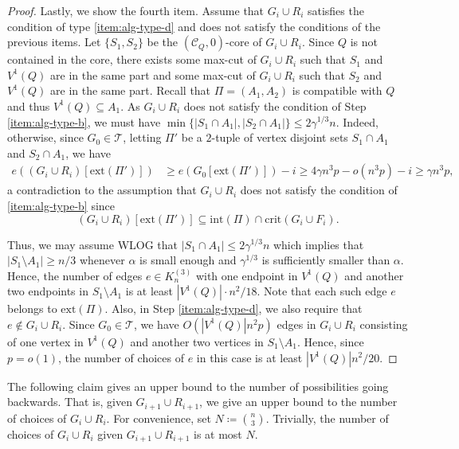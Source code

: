 \documentclass[11pt,a4paper,oneside,reqno]{amsart}
\newcommand{\cC}{\mathcal{C}}
\newcommand{\cT}{\mathcal{T}}
\newcommand{\1}{\mathbbm{1}} %
\renewcommand{\le}{\leqslant}
\renewcommand{\ge}{\geqslant}
\newcommand{\ext}{\mathrm{ext}}
\renewcommand{\int}{\mathrm{int}}
\newcommand{\crit}{\mathrm{crit}}
\begin{document}
\begin{proof}
    Lastly, we show the fourth item. Assume that $G_i \cup R_i$ satisfies the condition of type \ref{item:alg-type-d} and does not satisfy the conditions of the previous items. 
    Let $\{S_1, S_2\}$ be the $(\cC_Q, 0)$-core of $G_i \cup R_i$. Since $Q$ is not contained in the core,  there exists some max-cut of $G_i \cup R_i$ such that $S_1$ and $V^1(Q)$ are in the same part and some max-cut of $G_i \cup R_i$ such that $S_2$ and $V^1(Q)$ are in the same part. Recall that $\Pi = (A_1, A_2)$ is compatible with $Q$ and thus $V^1(Q) \subseteq A_1$. As $G_i \cup R_i$ does not satisfy the condition of Step \ref{item:alg-type-b}, we must have $\min\{|S_1 \cap A_1|, |S_2 \cap A_1|\} \le 2 \gamma^{1/3} n$. Indeed, otherwise, since $G_0 \in \cT$, letting $\Pi'$ be a $2$-tuple of vertex disjoint sets $S_1 \cap A_1$ and $S_2 \cap A_1$, we have
    \begin{align*}
        e\left((G_{i}\cup R_i)[\ext(\Pi')]\right) &\ge e\left(G_0[\ext(\Pi')]\right) - i \ge 4\gamma n^3 p - o(n^3 p) - i \ge \gamma n^3 p,
    \end{align*}
    a contradiction to the assumption that $G_i \cup R_i$ does not satisfy the condition of \ref{item:alg-type-b} since 
    \[
        (G_{i}\cup R_i)[\ext(\Pi')] \subseteq \int(\Pi) \cap \crit(G_i \cup F_i).
    \]
    
    Thus, we may assume WLOG that $|S_1 \cap A_1| \le 2 \gamma^{1/3} n$ which implies that $|S_1 \setminus A_1| \ge n/3$ whenever $\alpha$ is small enough and $\gamma^{1/3}$ is sufficiently smaller than $\alpha$. Hence, the number of edges $e \in K_n^{(3)}$ with one endpoint in $V^1(Q)$ and another two endpoints in $S_1 \setminus A_1$ is at least $|V^1(Q)| \cdot n^2 / 18$. Note that each such edge $e$ belongs to $\ext(\Pi)$. Also, in Step \ref{item:alg-type-d}, we also require that $e \notin G_i \cup R_i$. Since $G_0 \in \cT$, we have $O\left(|V^1(Q)| n^2 p\right)$ edges in $G_i \cup R_i$ consisting of one vertex in $V^1(Q)$ and another two vertices in $S_1 \setminus A_1$. Hence, since $p = o(1)$, the number of choices of $e$ in this case is at least $|V^1(Q)| n^2 / 20$.
\end{proof}
The following claim gives an upper bound to the number of possibilities going backwards. That is, given $G_{i+1} \cup R_{i+1}$, we give an upper bound to the number of choices of $G_i \cup R_i$. For convenience, set $N \coloneqq \binom{n}{3}$. Trivially, the number of choices of $G_i \cup R_i$ given $G_{i+1} \cup R_{i+1}$ is at most $N$.
\end{document}
